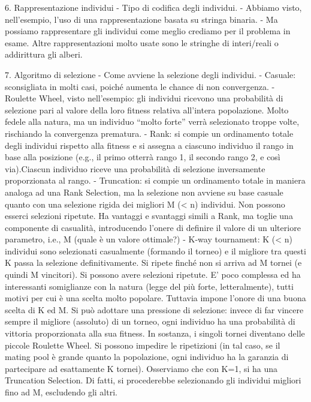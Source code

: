 \documentclass{article}
\begin{document}
    6. Rappresentazione individui - Tipo di codifica degli individui.
    - Abbiamo visto, nell’esempio, l’uso di una rappresentazione basata su stringa binaria.
    - Ma possiamo rappresentare gli individui come meglio crediamo per il problema in esame.
    Altre rappresentazioni molto usate sono le stringhe di interi/reali o addirittura gli alberi.

    7. Algoritmo di selezione - Come avviene la selezione degli individui.
    - Casuale: sconsigliata in molti casi, poiché aumenta le chance di non convergenza.
    - Roulette Wheel, visto nell’esempio: gli individui ricevono una probabilità di selezione pari al valore della loro fitness relativa all’intera popolazione.
    Molto fedele alla natura, ma un individuo “molto forte” verrà selezionato troppe volte, rischiando la convergenza prematura.
    - Rank: si compie un ordinamento totale degli individui rispetto alla fitness e si assegna a ciascuno individuo il rango in base alla posizione (e.g.,
    il primo otterrà rango 1, il secondo rango 2, e così via).Ciascun individuo riceve una probabilità di selezione inversamente proporzionata al rango.
    - Truncation: si compie un ordinamento totale in maniera analoga ad una Rank Selection, ma la selezione non avviene su base casuale quanto con una selezione
    rigida dei migliori M (< n) individui. Non possono esserci selezioni ripetute.
    Ha vantaggi e svantaggi simili a Rank, ma toglie una componente di casualità, introducendo l’onere di definire il valore di un ulteriore parametro, i.e., M
    (quale è un valore ottimale?)
    - K-way tournament: K (< n) individui sono selezionati casualmente (formando il torneo) e il migliore tra questi K passa la selezione definitivamente.
    Si ripete finché non si arriva ad M tornei (e quindi M vincitori). Si possono avere selezioni ripetute.
    E’ poco complessa ed ha interessanti somiglianze con la natura (legge del più forte, letteralmente), tutti motivi per cui è una scelta molto popolare.
    Tuttavia impone l’onore di una buona scelta di K ed M.
    Si può adottare una pressione di selezione: invece di far vincere sempre il migliore (assoluto) di un torneo, ogni individuo ha una probabilità di vittoria
    proporzionata alla sua fitness. In sostanza, i singoli tornei diventano delle piccole Roulette Wheel.
    Si possono impedire le ripetizioni (in tal caso, se il mating pool è grande quanto la popolazione, ogni individuo ha la garanzia di partecipare ad esattamente K
    tornei).
    Osserviamo che con K=1, si ha una Truncation Selection. Di fatti, si procederebbe selezionando gli individui migliori fino ad M, escludendo gli altri.
\end{document}
